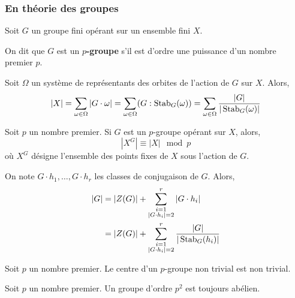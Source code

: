   \subsubsection{En théorie des groupes}


  Soit $G$ un groupe fini opérant sur un ensemble fini $X$.

  \begin{definition}
    On dit que $G$ est un \textbf{$p$-groupe} s'il est d'ordre une puissance d'un nombre premier $p$.
  \end{definition}

  \begin{theorem}
    Soit $\Omega$ un système de représentants des orbites de l'action de $G$ sur $X$. Alors,
    \[ |X| = \sum_{\omega \in \Omega} |G \cdot \omega| = \sum_{\omega \in \Omega} (G : \operatorname{Stab}_G(\omega)) = \sum_{\omega \in \Omega} \frac{|G|}{|\operatorname{Stab}_G(\omega)|} \]
  \end{theorem}

  \begin{corollary}
    Soit $p$ un nombre premier. Si $G$ est un $p$-groupe opérant sur $X$, alors,
    \[ |X^G| \equiv |X| \mod p \]
    où $X^G$ désigne l'ensemble des points fixes de $X$ sous l'action de $G$.
  \end{corollary}

  \begin{corollary}
    On note $G \cdot h_1, \dots, G \cdot h_r$ les classes de conjugaison de $G$. Alors,
    \begin{align*}
      \vert G \vert &= \vert Z(G) \vert + \sum_{\substack{i=1 \\ \vert G \cdot h_i \vert = 2}}^{r} \vert G \cdot h_i \vert \\
      &= \vert Z(G) \vert + \sum_{\substack{i=1 \\ \vert G \cdot h_i \vert = 2}}^{r} \frac{\vert G \vert}{\vert \operatorname{Stab}_G(h_i) \vert}
    \end{align*}
  \end{corollary}

  \begin{corollary}
    Soit $p$ un nombre premier. Le centre d'un $p$-groupe non trivial est non trivial.
  \end{corollary}

  \begin{corollary}
    Soit $p$ un nombre premier. Un groupe d'ordre $p^2$ est toujours abélien.
  \end{corollary}

